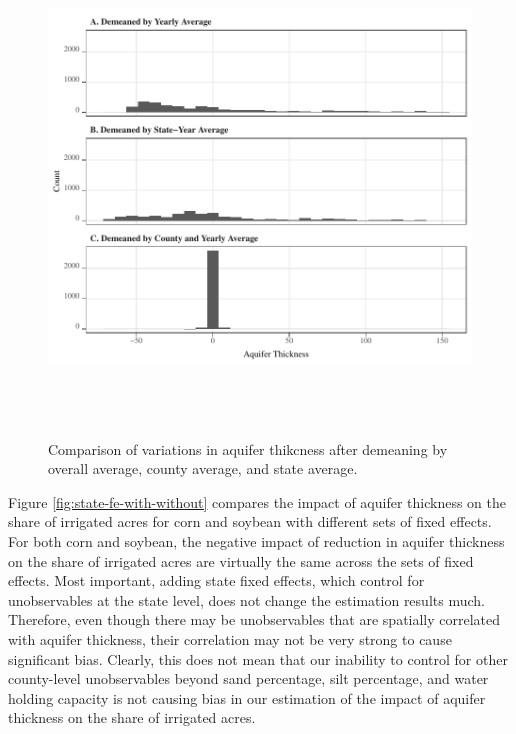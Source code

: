 \documentclass[
]{article}
\begin{document}
\begin{figure}[H]

{\centering \includegraphics[width=6in,height=500px,]{Figures/g_variation} 

}

\caption{Comparison of variations in aquifer thikcness after demeaning by overall average, county average, and state average.}\label{fig:variation-left}
\end{figure}

Figure \ref{fig:state-fe-with-without} compares the impact of aquifer thickness on the share of irrigated acres for corn and soybean with different sets of fixed effects. For both corn and soybean, the negative impact of reduction in aquifer thickness on the share of irrigated acres are virtually the same across the sets of fixed effects. Most important, adding state fixed effects, which control for unobservables at the state level, does not change the estimation results much. Therefore, even though there may be unobservables that are spatially correlated with aquifer thickness, their correlation may not be very strong to cause significant bias. Clearly, this does not mean that our inability to control for other county-level unobservables beyond sand percentage, silt percentage, and water holding capacity is not causing bias in our estimation of the impact of aquifer thickness on the share of irrigated acres.
\end{document}
